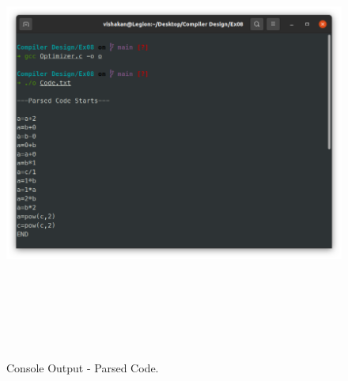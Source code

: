 \documentclass[12pt, a4]{article}
\begin{document}
\subsection*{}
\begin{figure}[h]
\centering
\caption{Console Output - Parsed Code.}
\includegraphics[height=15cm, width=15cm]{Output1.png}
\end{figure}

\newpage
\end{document}
